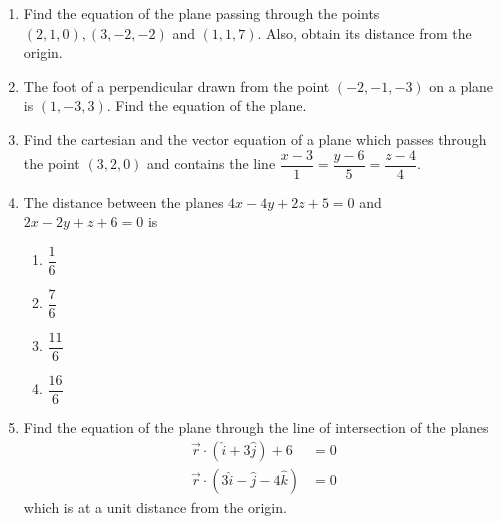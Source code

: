 %
\begin{enumerate}

	\item Find the equation of the plane passing through the points $(2,1,0),(3,-2,-2)$ and $(1,1,7)$. Also, obtain its distance from the origin.

	\item The foot of a perpendicular drawn from the point $(-2,-1,-3)$ on a plane is $(1,-3,3)$. Find the equation of the plane.

	\item Find the cartesian and the vector equation of a plane which passes through the point $(3,2,0)$ and contains the line $\dfrac{x-3}{1}=\dfrac{y-6}{5}=\dfrac{z-4}{4}$.

	\item The distance between the planes $4x-4y+2z+5=0$ and $2x-2y+z+6=0$ is

		\begin{enumerate}

			\item $\dfrac{1}{6}$
			\item $\dfrac{7}{6}$
			\item $\dfrac{11}{6}$
			\item $\dfrac{16}{6}$
		\end{enumerate}

	\item Find the equation of the plane through the line of intersection of the planes
		\begin{align}
			\vec{r}\cdot(\hat{i}+3\hat{j})+6&=0\\\vec{r}\cdot(3\hat{i}-\hat{j}-4\hat{k})&=0
		\end{align}which is at a  unit distance from the origin.
\end{enumerate}
%

